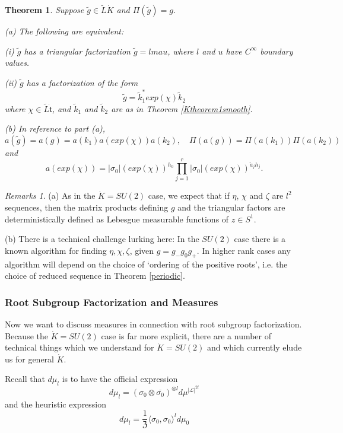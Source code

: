 \documentclass{amsart}
\newtheorem{theorem}{Theorem}[section]
\theoremstyle{conjecture}
\theoremstyle{definition}
\theoremstyle{question}
\theoremstyle{questions}
\theoremstyle{remark}
\theoremstyle{remarks}
\newtheorem*{remarks}{Remarks}
\theoremstyle{example}
\numberwithin{equation}{section}
\begin{document}
\begin{theorem}\label{smooththeorem}Suppose $\tilde g \in \tilde L\dot K$ and $\Pi(\tilde g)=g$.

(a) The following are equivalent:

(i) $\tilde g$ has a triangular factorization $\tilde g=lmau$,
where $l$ and $u$ have $C^{\infty}$ boundary values.

(ii) $\tilde g$ has a factorization of the form
$$\tilde g=\tilde k_1^* exp(\chi)\tilde k_2$$ where $\chi \in \tilde L\dot{\mathfrak t}$,
and $\tilde k_1$ and $\tilde k_2$ are as in Theorem
\ref{Ktheorem1smooth}.

(b) In reference to part (a),
\begin{equation}\label{diagonalclaim}a(\tilde g)=a(g)=
a(k_1)a(exp(\chi))a(k_2),\quad
\Pi(a(g))=\Pi(a(k_1))\Pi(a(k_2))\end{equation} and
\begin{equation}\label{abeliandiagonal}a(exp(\chi))=\vert \sigma_0
\vert(exp(\chi))^{h_0}\prod_{j=1}^r \vert \sigma_0
\vert(exp(\chi))^{\check a_j h_j}.  \end{equation}
\end{theorem}

\begin{remarks} (a) As in the $\dot K=SU(2)$ case, we expect that if $\eta$, $\chi$ and $\zeta$
are $l^2$ sequences, then the matrix products defining $g$ and the triangular factors
are deterministically defined as Lebesgue measurable functions of $z\in S^1$.

(b) There is a technical challenge lurking here: In the $SU(2)$ case there is a known algorithm for finding
$\eta,\chi,\zeta$, given $g=g_-g_0g_+$. In higher rank cases any algorithm will depend on the choice of `ordering of the positive roots', i.e. the choice of reduced sequence in Theorem \ref{periodic}.

\end{remarks}

\subsubsection{Root Subgroup Factorization and Measures}
Now we want to discuss measures in connection with root subgroup factorization. Because the $\dot K=SU(2)$ case is far more explicit, there are a number of technical things which we understand for $\dot K=SU(2)$ and which currently elude us for general $\dot K$.

Recall that $d\mu_l$ is to have the official expression
$$d\mu_l=(\sigma_0\otimes \overline{\sigma_0})^{\otimes l}d\mu^{|\mathcal L|^{2l}}$$
and the heuristic expression
\begin{equation}\label{heuristic8}d\mu_l=\frac{1}{\mathfrak Z}\langle \sigma_0,\sigma_0\rangle^l d\mu_0\end{equation}
\end{document}
